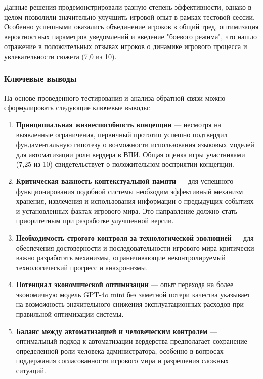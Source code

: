 Данные решения продемонстрировали разную степень эффективности, однако в целом позволили значительно улучшить игровой опыт в рамках тестовой сессии. Особенно успешными оказались объединение игроков в общий тред, оптимизация вероятностных параметров уведомлений и введение "{}боевого режима"{}, что нашло отражение в положительных отзывах игроков о динамике игрового процесса и увлекательности сюжета (7,0 из 10).

\subsubsection{Ключевые выводы}

На основе проведенного тестирования и анализа обратной связи можно сформулировать следующие ключевые выводы:

\begin{enumerate}
    \item \textbf{Принципиальная жизнеспособность концепции} — несмотря на выявленные ограничения, первичный прототип успешно подтвердил фундаментальную гипотезу о возможности использования языковых моделей для автоматизации роли вердера в ВПИ. Общая оценка игры участниками (7,25 из 10) свидетельствует о положительном восприятии концепции.

    \item \textbf{Критическая важность контекстуальной памяти} — для успешного функционирования подобной системы необходим эффективный механизм хранения, извлечения и использования информации о предыдущих событиях и установленных фактах игрового мира. Это направление должно стать приоритетным при разработке улучшенной версии.

    \item \textbf{Необходимость строгого контроля за технологической эволюцией} — для обеспечения достоверности и последовательности игрового мира критически важно разработать механизмы, ограничивающие неконтролируемый технологический прогресс и анахронизмы.

    \item \textbf{Потенциал экономической оптимизации} — опыт перехода на более экономичную модель GPT-4o mini без заметной потери качества указывает на возможность значительного снижения эксплуатационных расходов при правильной оптимизации системы.

    \item \textbf{Баланс между автоматизацией и человеческим контролем} — оптимальный подход к автоматизации вердерства предполагает сохранение определенной роли человека-администратора, особенно в вопросах поддержания согласованности игрового мира и разрешения сложных ситуаций.


\end{enumerate}
